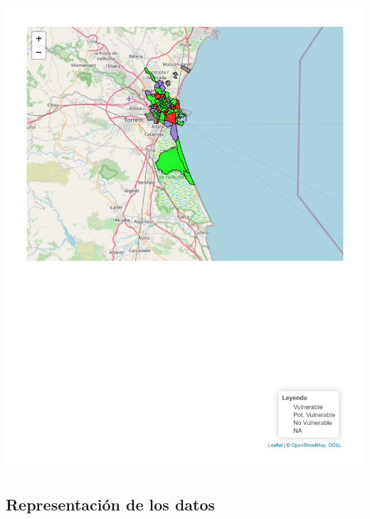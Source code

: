 \documentclass[notspecified,article,submit,moreauthors,pdftex]{Definitions/mdpi}
\begin{document}
\begin{center}\includegraphics{./figure/unnamed-chunk-22-1} \end{center}

\hypertarget{representaciuxf3n-de-los-datos}{%
\subsection{Representación de los
datos}\label{representaciuxf3n-de-los-datos}}
\end{document}
